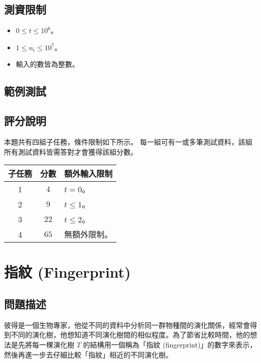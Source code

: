 \subsection{測資限制}

\begin{itemize}
\tightlist
\item
  \(0 \leq t \leq 10^6\)。
\item
  \(1 \leq n_i \leq 10^7\)。
\item
  輸入的數皆為整數。
\end{itemize}

\subsection{範例測試}

\begin{example}
%
%
\end{example}

\subsection{評分說明}

本題共有四組子任務，條件限制如下所示。
每一組可有一或多筆測試資料，該組所有測試資料皆需答對才會獲得該組分數。

\begin{longtable}[]{@{}ccl@{}}
\toprule
子任務 & 分數 & 額外輸入限制 \\
\midrule
\endhead
1 & \(4\) & \(t = 0\)。 \\
2 & \(9\) & \(t \leq 1\)。 \\
3 & \(22\) & \(t \leq 2\)。 \\
4 & \(65\) & 無額外限制。 \\
\bottomrule
\end{longtable}

\section{指紋 (Fingerprint)}

\subsection{問題描述}

彼得是一個生物專家，他從不同的資料中分析同一群物種間的演化關係，經常會得到不同的演化樹，他想知道不同演化樹間的相似程度。為了節省比較時間，他的想法是先將每一棵演化樹
\(T\) 的結構用一個稱為「指紋
(fingerprint)」的數字來表示，然後再進一步去仔細比較「指紋」相近的不同演化樹。

